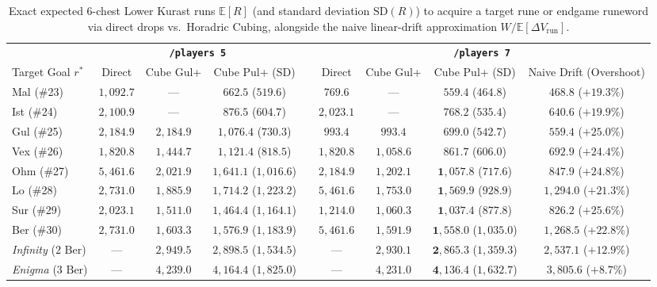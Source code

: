 \documentclass[11pt,reqno]{amsart}
\theoremstyle{definition}
\begin{document}
\begin{table}[htbp]
\centering
\caption{Exact expected $6$-chest Lower Kurast runs $\mathbb{E}[R]$ (and standard deviation $\text{SD}(R)$) to acquire a target rune or endgame runeword via direct drops vs.\ Horadric Cubing, alongside the naive linear-drift approximation $W/\mathbb{E}[\Delta V_{\text{run}}]$.}
\label{tab:cubing}
\scriptsize
\setlength{\tabcolsep}{3.5pt}
\begin{tabular}{@{}lcccccccc@{}}
\toprule
& \multicolumn{3}{c}{\textbf{\texttt{/players 5}}} & & \multicolumn{4}{c}{\textbf{\texttt{/players 7}}} \\
\cmidrule(lr){2-4} \cmidrule(lr){6-9}
Target Goal $r^*$ & Direct & Cube Gul+ & Cube Pul+ ($\text{SD}$) & & Direct & Cube Gul+ & Cube Pul+ ($\text{SD}$) & Naive Drift (Overshoot) \\
\midrule
Mal (\#23) & $1{,}092.7$ & --- & $662.5$ ($519.6$) & & $769.6$ & --- & $\mathbf{559.4}$ ($464.8$) & $468.8$ ($+19.3\%$) \\
Ist (\#24) & $2{,}100.9$ & --- & $876.5$ ($604.7$) & & $2{,}023.1$ & --- & $\mathbf{768.2}$ ($535.4$) & $640.6$ ($+19.9\%$) \\
Gul (\#25) & $2{,}184.9$ & $2{,}184.9$ & $1{,}076.4$ ($730.3$) & & $993.4$ & $993.4$ & $\mathbf{699.0}$ ($542.7$) & $559.4$ ($+25.0\%$) \\
\midrule
Vex (\#26) & $1{,}820.8$ & $1{,}444.7$ & $1{,}121.4$ ($818.5$) & & $1{,}820.8$ & $1{,}058.6$ & $\mathbf{861.7}$ ($606.0$) & $692.9$ ($+24.4\%$) \\
Ohm (\#27) & $5{,}461.6$ & $2{,}021.9$ & $1{,}641.1$ ($1{,}016.6$) & & $2{,}184.9$ & $1{,}202.1$ & $\mathbf{1{,}057.8}$ ($717.6$) & $847.9$ ($+24.8\%$) \\
Lo (\#28)  & $2{,}731.0$ & $1{,}885.9$ & $1{,}714.2$ ($1{,}223.2$) & & $5{,}461.6$ & $1{,}753.0$ & $\mathbf{1{,}569.9}$ ($928.9$) & $1{,}294.0$ ($+21.3\%$) \\
Sur (\#29) & $2{,}023.1$ & $1{,}511.0$ & $1{,}464.4$ ($1{,}164.1$) & & $1{,}214.0$ & $1{,}060.3$ & $\mathbf{1{,}037.4}$ ($877.8$) & $826.2$ ($+25.6\%$) \\
Ber (\#30) & $2{,}731.0$ & $1{,}603.3$ & $1{,}576.9$ ($1{,}183.9$) & & $5{,}461.6$ & $1{,}591.9$ & $\mathbf{1{,}558.0}$ ($1{,}035.0$) & $1{,}268.5$ ($+22.8\%$) \\
\midrule
\emph{Infinity} ($2\text{ Ber}$) & --- & $2{,}949.5$ & $2{,}898.5$ ($1{,}534.5$) & & --- & $2{,}930.1$ & $\mathbf{2{,}865.3}$ ($1{,}359.3$) & $2{,}537.1$ ($+12.9\%$) \\
\emph{Enigma} ($3\text{ Ber}$) & --- & $4{,}239.0$ & $4{,}164.4$ ($1{,}825.0$) & & --- & $4{,}231.0$ & $\mathbf{4{,}136.4}$ ($1{,}632.7$) & $3{,}805.6$ ($+8.7\%$) \\
\bottomrule
\end{tabular}
\end{table}
\end{document}

